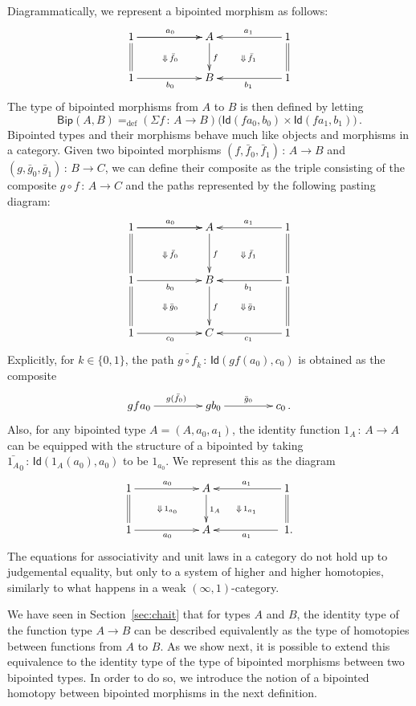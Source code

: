 \documentclass[10pt,a4paper,oneside,reqno]{amsart}
\numberwithin{equation}{section}
\theoremstyle{mythm}
\theoremstyle{mydef}
\theoremstyle{myrmk}
\newcommand{\defeq}{=_{\mathrm{def}}}
\newcommand{\co}{\,{:}\,}
\newcommand{\Id}{\mathsf{Id}}
\newcommand{\BipHom}{\mathsf{Bip}}
\begin{document}
Diagrammatically, we represent a bipointed morphism as follows:
\[
\xymatrix@C=2cm{
1 \ar[r]   \ar[r]^{a_0} \ar@{=}[d]  \ar@{}[dr]|{\Downarrow \, \bar{f}_0} & A  \ar[d]^{f} & 1  \ar[l]_{a_1} \ar@{=}[d] \ar@{}[dl]|{\Downarrow \,  \bar{f}_1} \\
1 \ar[r]_{b_0}  & B   & 1 \ar[l]^{b_1} }
 \]
The type of bipointed morphisms from $A$ to $B$ is then defined by letting
\[
\BipHom(A,B) \defeq (\Sigma f \co A \to B) \big( \Id(  f a_0, b_0 )  \times \Id(  f a_1 , b_1 )  \big) \, .
\]
 Bipointed types and their morphisms behave much like objects and morphisms in a category.
Given two bipointed morphisms  $(f, \bar{f}_0, \bar{f}_1) \co A \to B$ and $(g, \bar{g}_0, \bar{g}_1) \co B \to C$, we can define their composite 
 as the triple consisting of the composite $g \circ f \co A \to C$ and the paths represented
by the following pasting diagram:
\[
\xymatrix@C=2cm@R=1.2cm{
1 \ar[r]   \ar[r]^{a_0} \ar@{=}[d]  \ar@{}[dr]|{\Downarrow \, \bar{f}_0} & A  \ar[d]^{f} & 1  \ar[l]_{a_1} \ar@{=}[d] \ar@{}[dl]|{\Downarrow \,  \bar{f}_1} \\
1 \ar[r]_{b_0}   \ar@{}[dr]|{\Downarrow \, \bar{g}_0}  \ar@{=}[d] & B \ar[d]^f   & 1 \ar[l]^{b_1} \ar@{=}[d] \ar@{}[dl]|{\Downarrow \,  \bar{g}_1} \\
1 \ar[r]_{c_0}  & C   & 1 \ar[l]^{c_1}}
 \]
Explicitly, for $k \in \{ 0, 1 \}$, the path $\overline{g \circ f}_k \co \Id( g f( a_0), c_0)$ is obtained as the composite
\[
\xymatrix@C=1.5cm{
g f a_0 \ar[r]^{g(\bar{f}_0)} & g b_0 \ar[r]^{\bar{g}_0} & c_0 \, .}
\]
Also, for any bipointed type $A = (A, a_0, a_1)$, the identity function $1_A \co A \to A$ can be equipped with the structure of a bipointed by taking $\bar{1_A}_0 \co \Id( 1_A(a_0), a_0)$ to be $1_{a_0}$. We represent this as the
diagram
 \begin{equation}
 \label{equ:bipidA}
{\vcenter{\hbox{\xymatrix@C=2cm{
1 \ar[r]^{a_0} \ar@{=}[d] \ar@{}[dr]|{\Downarrow \, 1_{a_0}}& A \ar[d]^{1_A} & 
1 \ar[l]_{a_1} \ar@{=}[d]  \ar@{}[dl]|{\Downarrow \, 1_{a_1}}  \\ 
 1 \ar[r]_{a_0} & A & \; 1 .\ar[l]^{a_1} }}}}
 \end{equation}
The equations for associativity and unit laws in a category do not hold up to judgemental equality, but only 
to a system of higher and higher homotopies, similarly to what happens in a weak $(\infty,1)$-category.  


We have seen in Section~\ref{sec:chait} that for types $A$ and $B$, the identity type of the function type
$A \to B$ can be described equivalently as the type of homotopies between functions from $A$ to $B$. As
we show next, it is possible to extend this equivalence to the identity type of the type of bipointed morphisms
between two bipointed types. In order to do so, we  introduce the notion of a bipointed homotopy between bipointed morphisms in the next definition. 
\end{document}
